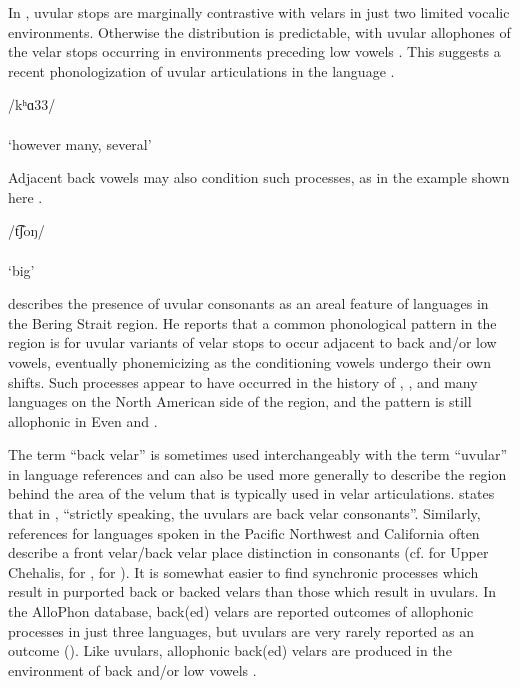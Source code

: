   In , uvular stops are marginally contrastive with velars in just two limited vocalic environments. Otherwise the distribution is predictable, with uvular allophones of the velar stops occurring in environments preceding low vowels . This suggests a recent phonologization of uvular articulations in the language \citep[28]{Lidz2010}.

\ea\label{ex:4.39}
\gll /kʰɑ33/\\
[qʰɑ33]\\
\glt ‘however many, several’ \citep[80]{Lidz2010}
\z

Adjacent back vowels may also condition such processes, as in the  example shown here .

\ea\label{ex:4.40}
\gll /t͡ʃoŋ/\\
[t͡ʃoɴ]\\
\glt ‘big’ \citep[76]{Hahn1991}
\z

  \citet[72,91]{Fortescue1998} describes the presence of uvular consonants as an areal feature of languages in the Bering Strait region. He reports that a common phonological pattern in the region is for uvular variants of velar stops to occur adjacent to back and/or low vowels, eventually phonemicizing as the conditioning vowels undergo their own shifts. Such processes appear to have occurred in the history of , , and many languages on the North American side of the region, and the pattern is still allophonic in Even and .

  The term ``back velar'' is sometimes used interchangeably with the term ``uvular'' in language references and can also be used more generally to describe the region behind the area of the velum that is typically used in velar articulations. \citet[20]{VandenBerg1995} states that in , “strictly speaking, the uvulars are back velar consonants”. Similarly, references for languages spoken in the Pacific Northwest and California often describe a front velar/back velar place distinction in consonants (cf. \citealt{Kinkade1963} for Upper Chehalis, \citealt{Harris1981} for , \citealt{Golla1970} for ). It is somewhat easier to find synchronic processes which result in purported back or backed velars than those which result in uvulars. In the AlloPhon database, back(ed) velars are reported outcomes of allophonic processes in just three languages, but uvulars are very rarely reported as an outcome (\citealt{BybeeEasterday2019}). Like uvulars, allophonic back(ed) velars are produced in the environment of back and/or low vowels .

